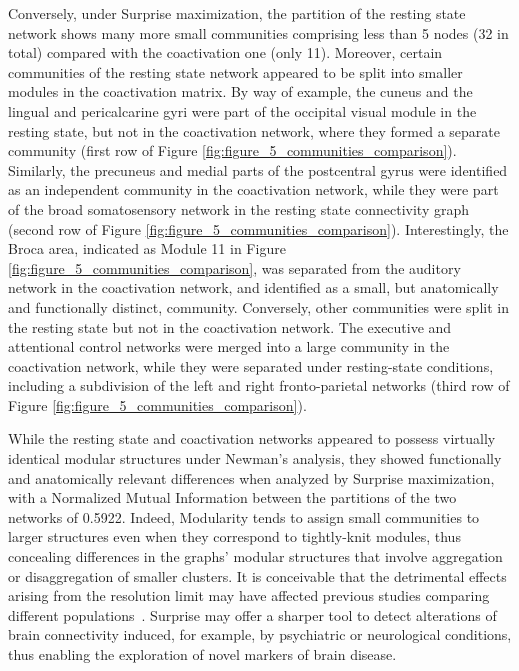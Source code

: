 Conversely, under Surprise maximization, the partition of the resting state network shows many more small communities comprising less than 5 nodes (32 in total) compared with the coactivation one (only 11). Moreover, certain communities of the resting state network appeared to be split into smaller modules in the coactivation matrix. 
By way of example, the cuneus and the lingual and pericalcarine gyri were part of the occipital visual module in the resting state, but not in the coactivation network, where they formed a separate community (first row of Figure \ref{fig:figure_5_communities_comparison}).
Similarly, the precuneus and medial parts of the postcentral gyrus were identified as an independent community in the coactivation network, while they were part of the broad somatosensory network in the resting state connectivity graph~\cite{rubinov2011} (second row of Figure \ref{fig:figure_5_communities_comparison}).
Interestingly, the Broca area, indicated as Module 11 in Figure \ref{fig:figure_5_communities_comparison}, was separated from the auditory network in the coactivation network, and identified as a small, but anatomically and functionally distinct, community.
Conversely, other communities were split in the resting state but not in the coactivation network. The executive and attentional control networks were merged into a large community in the coactivation network, while they were separated under resting-state conditions, including a subdivision of the left and right fronto-parietal networks (third row of Figure \ref{fig:figure_5_communities_comparison}).

While the resting state and coactivation networks appeared to possess virtually identical modular structures under Newman's analysis, they showed functionally and anatomically relevant differences when analyzed by Surprise maximization, with a Normalized Mutual Information between the partitions of the two networks of 0.5922. Indeed, Modularity tends to assign small communities to larger structures even when they correspond to tightly-knit modules, thus concealing differences in the graphs' modular structures that involve aggregation or disaggregation of smaller clusters. It is conceivable that the detrimental effects arising from the resolution limit may have affected previous studies comparing different populations~\cite{meunier2010}.
Surprise may offer a sharper tool to detect alterations of brain connectivity induced, for example, by psychiatric or neurological conditions, thus enabling the exploration of novel markers of brain disease.

